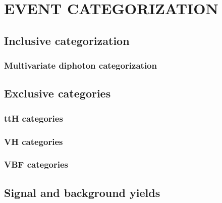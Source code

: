 \chapter{EVENT CATEGORIZATION}
\section{Inclusive categorization}
\subsection{Multivariate diphoton categorization}
\section{Exclusive categories}
\subsection{ttH categories}
\subsection{VH categories}
\subsection{VBF categories}
\section{Signal and background yields}
